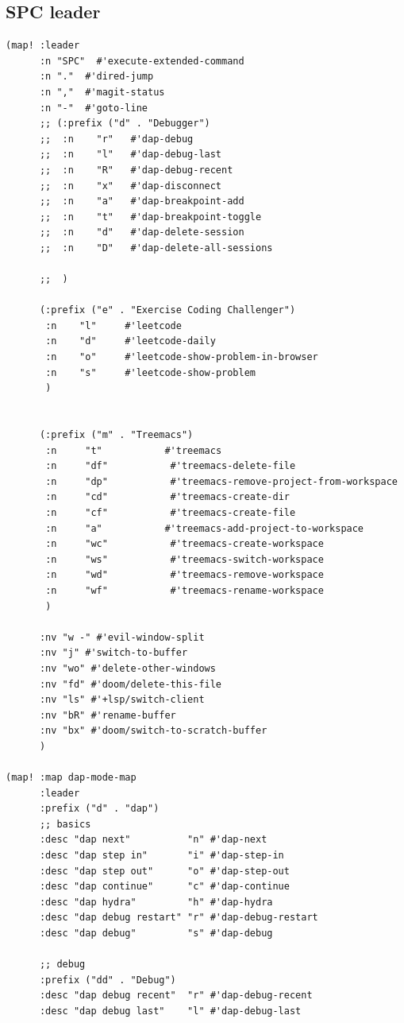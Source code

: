\documentclass[11pt]{article}
\begin{document}
\subsection{SPC leader}
\label{sec:org137674c}
\begin{verbatim}
(map! :leader
      :n "SPC"  #'execute-extended-command
      :n "."  #'dired-jump
      :n ","  #'magit-status
      :n "-"  #'goto-line
      ;; (:prefix ("d" . "Debugger")
      ;;  :n    "r"   #'dap-debug
      ;;  :n    "l"   #'dap-debug-last
      ;;  :n    "R"   #'dap-debug-recent
      ;;  :n    "x"   #'dap-disconnect
      ;;  :n    "a"   #'dap-breakpoint-add
      ;;  :n    "t"   #'dap-breakpoint-toggle
      ;;  :n    "d"   #'dap-delete-session
      ;;  :n    "D"   #'dap-delete-all-sessions

      ;;  )

      (:prefix ("e" . "Exercise Coding Challenger")
       :n    "l"     #'leetcode
       :n    "d"     #'leetcode-daily
       :n    "o"     #'leetcode-show-problem-in-browser
       :n    "s"     #'leetcode-show-problem
       )


      (:prefix ("m" . "Treemacs")
       :n     "t"           #'treemacs
       :n     "df"           #'treemacs-delete-file
       :n     "dp"           #'treemacs-remove-project-from-workspace
       :n     "cd"           #'treemacs-create-dir
       :n     "cf"           #'treemacs-create-file
       :n     "a"           #'treemacs-add-project-to-workspace
       :n     "wc"           #'treemacs-create-workspace
       :n     "ws"           #'treemacs-switch-workspace
       :n     "wd"           #'treemacs-remove-workspace
       :n     "wf"           #'treemacs-rename-workspace
       )

      :nv "w -" #'evil-window-split
      :nv "j" #'switch-to-buffer
      :nv "wo" #'delete-other-windows
      :nv "fd" #'doom/delete-this-file
      :nv "ls" #'+lsp/switch-client
      :nv "bR" #'rename-buffer
      :nv "bx" #'doom/switch-to-scratch-buffer
      )

(map! :map dap-mode-map
      :leader
      :prefix ("d" . "dap")
      ;; basics
      :desc "dap next"          "n" #'dap-next
      :desc "dap step in"       "i" #'dap-step-in
      :desc "dap step out"      "o" #'dap-step-out
      :desc "dap continue"      "c" #'dap-continue
      :desc "dap hydra"         "h" #'dap-hydra
      :desc "dap debug restart" "r" #'dap-debug-restart
      :desc "dap debug"         "s" #'dap-debug

      ;; debug
      :prefix ("dd" . "Debug")
      :desc "dap debug recent"  "r" #'dap-debug-recent
      :desc "dap debug last"    "l" #'dap-debug-last


\end{verbatim}
\end{document}
